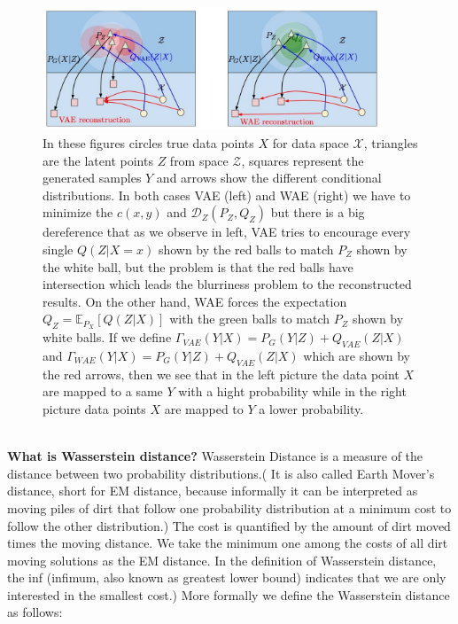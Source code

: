 \documentclass[12pt,english]{amsart}
\theoremstyle{definition}
\begin{document}
\begin{figure}[h!]
\centering
\includegraphics[width=0.9\textwidth]{diagram}

\caption{In these figures circles true data points $X$ for data space
$\mathcal{X}$, triangles are the latent points $Z$ from space $\mathcal{Z}$,
squares represent the generated samples $Y$ and arrows show the different
conditional distributions. In both cases VAE (left) and WAE (right) we have to
minimize the $c(x,y)$ and $\mathcal{D}_Z(P_Z,Q_Z)$  but there is a big
dereference that as we observe in left, VAE tries to encourage every single
$Q(Z|X=x)$ shown by the red balls to match $P_Z$ shown by the white ball, but
the problem is that the red balls have intersection which leads the blurriness
problem to the reconstructed results. On the other hand, WAE forces the
expectation $Q_Z= \mathbb{E}_{P_X}\left[ Q(Z|X)\right]$  with the green balls to
match $P_Z$ shown by white balls. If we define
$\Gamma_{VAE}(Y|X)= P_G(Y|Z)+ Q_{VAE}(Z|X)$ and
$\Gamma _{WAE}(Y|X)= P_G(Y|Z)+ Q_{VAE}(Z|X)$ which are shown by the red arrows,
then we see that in the left picture the data point $X$ are mapped to a same $Y$
with a hight probability while in the right picture data points $X$ are mapped to
$Y$ a lower probability. }

\label{fig:WAE}
\end{figure}\\

 \textbf{What is Wasserstein distance?}
Wasserstein Distance is a measure of the distance between two probability
distributions.( It is also called Earth Mover's distance, short for EM distance,
because informally it can be interpreted as moving piles of dirt that follow one
probability distribution at a minimum cost to follow the other distribution.)
The cost is quantified by the amount of dirt moved times the moving distance. We
take the minimum one among the costs of all dirt moving solutions as the EM
distance. In the definition of Wasserstein distance, the inf (infimum, also
known as greatest lower bound) indicates that we are only interested in the
smallest cost.) More formally we define the Wasserstein distance as follows:
\end{document}
